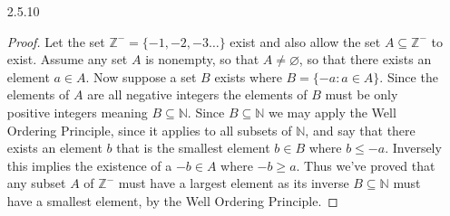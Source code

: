 \documentclass[11pt]{amsart}
\theoremstyle{definition}
\begin{document}
\begin{itemize}
\begin{itemize}
\end{itemize}

\item[2.5.10]\begin{proof}
    Let the set $\mathbb{Z}^-=\{-1,-2,-3\ldots\}$ exist and also allow the set $A\subseteq \mathbb{Z}^-$ to exist. Assume any set $A$ is nonempty, so that $A\ne \varnothing$, so that there exists an element $a\in A$. Now suppose a set $B$ exists where $B=\{-a:a\in A\}$. Since the elements of $A$ are all negative integers the elements of $B$ must be only positive integers meaning $B\subseteq \mathbb{N}$. Since $B\subseteq \mathbb{N}$ we may apply the Well Ordering Principle, since it applies to all subsets of $\mathbb{N}$, and say that there exists an element $b$ that is the smallest element $b\in B$ where $b\le -a$. Inversely this implies the existence of a $-b\in A$ where $-b\ge a$. Thus we've proved that any subset $A$ of $\mathbb{Z}^-$ must have a largest element as its inverse $B\subseteq\mathbb{N}$ must have a smallest element, by the Well Ordering Principle.
\end{proof}

\end{itemize}
\end{document}
